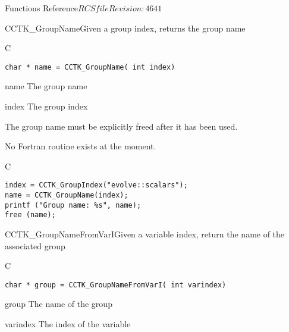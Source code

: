 \begin{cactuspart}{ Functions Reference}{$RCSfile$}{$Revision: 4641 $}
\begin{FunctionDescription}{CCTK\_GroupName}{Given a group index, returns the group name}
\label{CCTK-GroupName}
\begin{SynopsisSection}
\begin{Synopsis}{C}
\begin{verbatim}char * name = CCTK_GroupName( int index)\end{verbatim}
\end{Synopsis}
\end{SynopsisSection}
\begin{ParameterSection}
\begin{Parameter}{name}
The group name
\end{Parameter}
\begin{Parameter}{index}
The group index
\end{Parameter}
\end{ParameterSection}
\begin{Discussion}
The group name must be explicitly freed after it has been used.

No Fortran routine exists at the moment.
\end{Discussion}
\begin{ExampleSection}
\begin{Example}{C}
\begin{verbatim}
index = CCTK_GroupIndex("evolve::scalars");
name = CCTK_GroupName(index);
printf ("Group name: %s", name);
free (name);
\end{verbatim}
\end{Example}
\end{ExampleSection}
\end{FunctionDescription}


\begin{FunctionDescription}{CCTK\_GroupNameFromVarI}{Given a variable index, return the name of the associated group}
\label{CCTK-GroupNameFromVarI}
\begin{SynopsisSection}
\begin{Synopsis}{C}
\begin{verbatim}char * group = CCTK_GroupNameFromVarI( int varindex)\end{verbatim}
\end{Synopsis}
\end{SynopsisSection}
\begin{ParameterSection}
\begin{Parameter}{group}
The name of the group
\end{Parameter}
\begin{Parameter}{varindex}
The index of the variable
\end{Parameter}
\end{ParameterSection}


\end{FunctionDescription}
\end{cactuspart}
